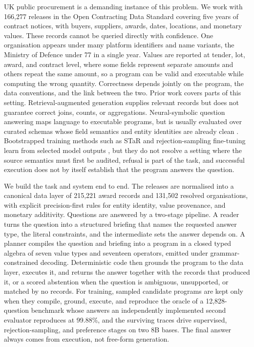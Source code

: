 \documentclass{article}
\begin{document}
UK public procurement is a demanding instance of this problem. We work
with 166{,}277 releases in the Open Contracting Data Standard covering
five years of contract notices, with buyers, suppliers, awards, dates,
locations, and monetary values. These records cannot be queried directly
with confidence. One organisation appears under many platform identifiers
and name variants, the Ministry of Defence under 77 in a single year.
Values are reported at tender, lot, award, and contract level, where some
fields represent separate amounts and others repeat the same amount, so a
program can be valid and executable while computing the wrong quantity.
Correctness depends jointly on the program, the data conventions, and the
link between the two. Prior work covers parts of this setting.
Retrieval-augmented generation supplies relevant records but does not
guarantee correct joins, counts, or aggregations. Neural-symbolic
question answering maps language to executable programs, but is usually
evaluated over curated schemas whose field semantics and entity identities
are already clean \citep{cheng2023binder,gu2023pangu,luo2024chatkbqa}.
Bootstrapped training methods such as STaR and rejection-sampling
fine-tuning learn from selected model outputs
\citep{zelikman2022star,yuan2023scaling,gulcehre2023rest}, but they do not
resolve a setting where the source semantics must first be audited,
refusal is part of the task, and successful execution does not by itself
establish that the program answers the question.

We build the task and system end to end. The releases are normalised into
a canonical data layer of 215{,}221 award records and 131{,}502 resolved
organisations, with explicit precision-first rules for entity identity,
value provenance, and monetary additivity. Questions are answered by a
two-stage pipeline. A reader turns the question into a structured
briefing that names the requested answer type, the literal constraints,
and the intermediate sets the answer depends on. A planner compiles the
question and briefing into a program in a closed typed algebra of seven
value types and seventeen operators, emitted under grammar-constrained
decoding. Deterministic code then grounds the program to the data layer,
executes it, and returns the answer together with the records that
produced it, or a scored abstention when the question is ambiguous,
unsupported, or matched by no records. For training, sampled candidate
programs are kept only when they compile, ground, execute, and reproduce
the oracle of a 12{,}828-question benchmark whose answers an
independently implemented second evaluator reproduces at 99.88\%, and the
surviving traces drive supervised, rejection-sampling, and preference
stages on two 8B bases. The final answer always comes from execution, not
free-form generation.
\end{document}
